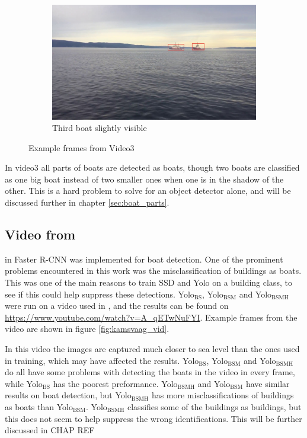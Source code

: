 \begin{figure}[h!]
\begin{subfigure}[b]{0.78\textwidth}
   \includegraphics[width=1\linewidth]{results/video/video3/frame208.jpg}
   \caption{Third boat slightly visible}
   \label{fig:video3_slightly}
\end{subfigure}
\caption{Example frames from Video3}
\label{fig:video3}
\end{figure}

\newpage

In video3 all parts of boats are detected as boats, though two boats are classified as one big boat instead of two smaller ones when one is in the shadow of the other. This is a hard problem to solve for an object detector alone, and will be discussed further in chapter \ref{sec:boat_parts}. 


\subsection{Video from \citep{Kamsvag2018}}

in \citep{Kamsvag2018} Faster R-CNN was implemented for boat detection. One of the prominent problems encountered in this work was the misclassification of buildings as boats. This was one of the main reasons to train SSD and Yolo on a building class, to see if this could help suppress these detections. Yolo$_{\text{BS}}$, Yolo$_{\text{BSM}}$ and Yolo$_{\text{BSMH}}$ were run on a video used in \citep{Kamsvag2018}, and the results can be found on \url{https://www.youtube.com/watch?v=A_qETwNuFYI}. Example frames from the video are shown in figure \ref{fig:kamsvaag_vid}.

\vspace{3mm}

In this video the images are captured much closer to sea level than the ones used in training, which may have affected the results. Yolo$_{\text{BS}}$, Yolo$_{\text{BSM}}$ and Yolo$_{\text{BSMH}}$ do all have some problems with detecting the boats in the video in every frame, while Yolo$_{\text{BS}}$ has the poorest preformance. Yolo$_{\text{BSMH}}$ and Yolo$_{\text{BSM}}$ have similar results on boat detection, but Yolo$_{\text{BSMH}}$ has more misclassifications of buildings as boats than Yolo$_{\text{BSM}}$. Yolo$_{\text{BSMH}}$ classifies some of the buildings as buildings, but this does not seem to help suppress the wrong identifications. This will be further discussed in CHAP REF

